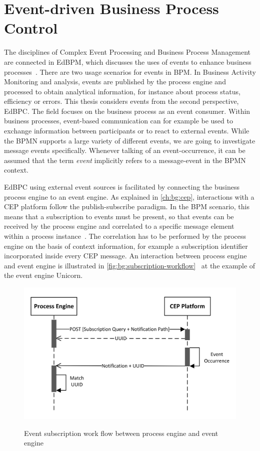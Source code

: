 \section{Event-driven Business Process Control}
The disciplines of Complex Event Processing and Business Process Management are connected in \acf{EdBPM}, which discusses the uses of events to enhance business processes~\cite{evtprocessing}.
There are two usage scenarios for events in BPM. In Business Activity Monitoring and analysis, events are published by the process engine and processed to obtain analytical information, for instance about process status, efficiency or errors.
This thesis considers events from the second perspective, \acf{EdBPC}. The field focuses on the business process as an event consumer.
Within business processes, event-based communication can for example be used to exchange information between participants or to react to external events. While the BPMN supports a large variety of different events, we are going to investigate message events specifically. Whenever talking of an event-occurrence, it can be assumed that the term \textit{event} implicitly refers to a message-event in the BPMN context.

\ac{EdBPC} using external event sources is facilitated by connecting the business process engine to an event engine.
As explained in \autoref{ch:bg:cep}, interactions with a CEP platform follow the publish-subscribe paradigm.
In the BPM scenario, this means that a subscription to events must be present, so that events can be received by the process engine and correlated to a specific message element within a process instance~\cite{Baumgrass2016}.
The correlation has to be performed by the process engine on the basis of context information, for example a subscription identifier incorporated inside every CEP message. 
An interaction between process engine and event engine is illustrated in \autoref{fig:bg:subscription-workflow}~\cite[,\,p.\,13]{mandal:2017} at the example of the event engine Unicorn.

\begin{figure}[]
	\myfloatalign
	{\includegraphics[width=0.6\linewidth]{chapters/background/subscription-workflow.png}}
	\caption{Event subscription work flow between process engine and event engine}
	\label{fig:bg:subscription-workflow}
\end{figure}

